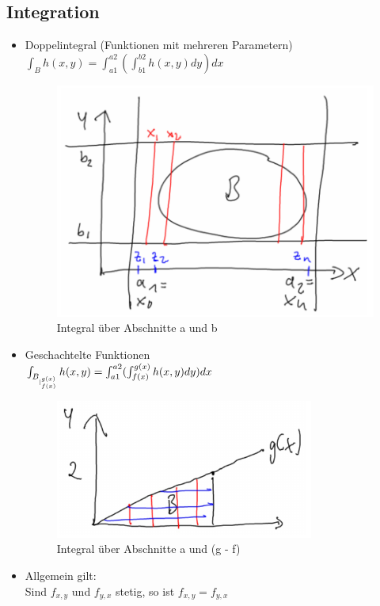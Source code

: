 \subsection{Integration}
\begin{itemize}
	\item Doppelintegral (Funktionen mit mehreren Parametern) \\
	$\int_B h(x, y) = \int_{a1}^{a2}(\int_{b1}^{b2} h(x, y) dy) dx$
    \begin{figure}[h!]
        \centering
        \includegraphics[scale=.5]{pics/doppelintegral}
        \caption{Integral über Abschnitte a und b}
    \end{figure}

	\item Geschachtelte Funktionen \\
	$\int_{B_{\arrowvert_{f(x)}^{g(x)}}} h(x, y) = \int_{a1}^{a2}(\int_{f(x)}^{g(x)} h(x, y) dy) dx$
    \begin{figure}[h!]
        \centering
        \includegraphics[scale=.5]{pics/doppelintegralfunktionen}
        \caption{Integral über Abschnitte a und (g - f)}
    \end{figure}

	\item Allgemein gilt: \\
	Sind $f_{x,y}$ und $f_{y,x}$ stetig, so ist $f_{x,y} = f_{y,x}$
\end{itemize}

